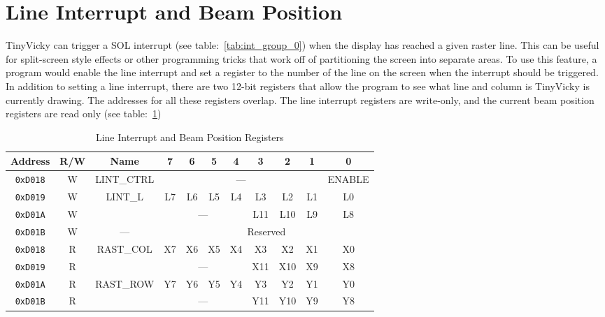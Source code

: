 \section*{Line Interrupt and Beam Position}

TinyVicky can trigger a SOL interrupt (see table:~\ref{tab:int_group_0}) when the display has reached a given raster line. This can be useful for split-screen style effects or other programming tricks that work off of partitioning the screen into separate areas. To use this feature, a program would enable the line interrupt and set a register to the number of the line on the screen when the interrupt should be triggered. In addition to setting a line interrupt, there are two 12-bit registers that allow the program to see what line and column is TinyVicky is currently drawing. The addresses for all these registers overlap. The line interrupt registers are write-only, and the current beam position registers are read only (see table:~\ref{tab:lint_reg})

\begin{table}[ht]
    \begin{center}
        \begin{tabular}{|c|c|c|c|c|c|c|c|c|c|c|} \hline
            Address & R/W & Name & 7 & 6 & 5 & 4 & 3 & 2 & 1 & 0 \\\hline\hline
            \verb+0xD018+ & W & LINT\_CTRL & \multicolumn{7}{|c|}{---} & ENABLE \\ \hline
            \verb+0xD019+ & W & \multirow{2}{*}{LINT\_L} & L7 & L6 & L5 & L4 & L3 & L2 & L1 & L0 \\ \cline{1-2}\cline{4-11}
            \verb+0xD01A+ & W &  & \multicolumn{4}{|c|}{---} & L11 & L10 & L9 & L8 \\ \hline
            \verb+0xD01B+ & W & --- & \multicolumn{8}{|c|}{Reserved} \\ \hline

            \verb+0xD018+ & R & \multirow{2}{*}{RAST\_COL} & X7 & X6 & X5 & X4 & X3 & X2 & X1 & X0 \\  \cline{1-2}\cline{4-11}
            \verb+0xD019+ & R & & \multicolumn{4}{|c|}{---} & X11 & X10 & X9 & X8 \\ \hline
            \verb+0xD01A+ & R & \multirow{2}{*}{RAST\_ROW} & Y7 & Y6 & Y5 & Y4 & Y3 & Y2 & Y1 & Y0 \\  \cline{1-2}\cline{4-11}
            \verb+0xD01B+ & R & & \multicolumn{4}{|c|}{---} & Y11 & Y10 & Y9 & Y8 \\ \hline
        \end{tabular}
    \end{center}
    \caption{Line Interrupt and Beam Position Registers}
    \label{tab:lint_reg}
\end{table}

